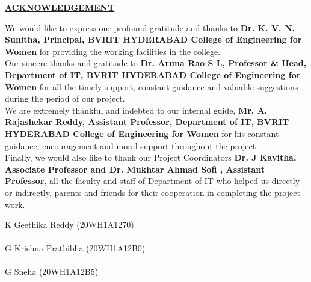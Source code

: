 \documentclass[12pt, English]{article}
\begin{document}
\begin{titlepage}
\begin{center}
    \textbf{\normalsize \underline{ACKNOWLEDGEMENT}}\\
\end{center}
\vspace*{0.2in}
\begin{normalsize}
We would like to express our profound gratitude and thanks to \textbf{Dr. K. V. N. Sunitha, Principal, BVRIT HYDERABAD College of Engineering for Women} for providing the working facilities in the college.\\
\newline
Our sincere thanks and gratitude to \textbf{Dr. Aruna Rao S L, Professor \& Head, Department of IT, BVRIT HYDERABAD College of Engineering for Women} for all the timely support, constant guidance and valuable suggestions during the period of our project.\\
\newline
We are extremely thankful and indebted to our internal guide, \textbf{Mr. A. Rajashekar Reddy, Assistant Professor, Department of IT, BVRIT HYDERABAD College of Engineering for Women} for his constant guidance, encouragement and moral support throughout the project.\\
\newline
Finally, we would also like to thank our Project Coordinators \textbf{Dr. J Kavitha, Associate Professor and Dr. Mukhtar Ahmad Sofi , Assistant Professor}, all the faculty and staff of Department of IT who helped us directly or indirectly, parents and friends for their cooperation in completing the project work.
\end{normalsize}

\raggedleft
\vspace*{0.5in}
\begin{normalsize}
{ K Geethika Reddy (20WH1A1270)}\\ \\
\vspace*{0.25in}
\raggedleft
{ G Krishna Prathibha (20WH1A12B0)}\\ \\
\vspace*{0.25in}
\raggedleft
{ G Sneha (20WH1A12B5)}\\\\
\end{normalsize}
\end{titlepage}
\end{document}
